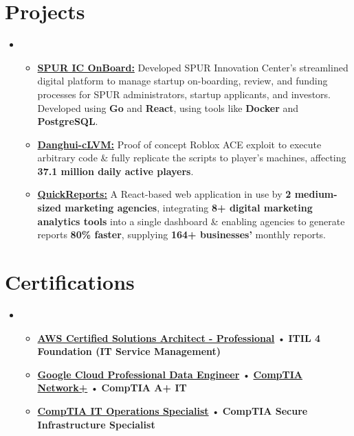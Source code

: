 \documentclass[letterpaper,11pt]{article}
\newcommand{\cvitem}[1]{
  \item\small{
    {#1\vspace{-2pt}}
  }
}
\newcommand{\cvheadingstart}{\begin{itemize}[leftmargin=0in, label={}]}
\newcommand{\cvheadingend}{\end{itemize}}
\newcommand{\cvitemstart}{\begin{itemize}\justifying}
\newcommand{\cvitemend}{\end{itemize}\vspace{-5pt}}
\begin{document}
\section{Projects}
\cvheadingstart
\item
\cvitemstart
  \cvitem{\textbf{\href{https://github.com/KonferCA/SPUR}{SPUR IC OnBoard:}} Developed SPUR Innovation Center's streamlined digital platform to manage startup on-boarding, review, and funding processes for SPUR administrators, startup applicants, and investors. Developed using \textbf{Go} and \textbf{React}, using tools like \textbf{Docker} and \textbf{PostgreSQL}.}
  \vspace{6pt}
  \cvitem{\textbf{\href{https://github.com/AmirAgassi/Danghui-LVM}{Danghui-cLVM:}} Proof of concept Roblox ACE exploit to execute arbitrary code \& fully replicate the scripts to player's machines, affecting \textbf{37.1 million daily active players}.}
  \vspace{6pt}
  \cvitem{\textbf{\href{https://quickreports.me}{QuickReports:}} A React-based web application in use by \textbf{2 medium-sized marketing agencies}, integrating \textbf{8+ digital marketing analytics tools} into a single dashboard \& enabling agencies to generate reports \textbf{80\% faster}, supplying \textbf{164+ businesses'} monthly reports.}
\cvitemend
\cvheadingend

\section{Certifications}
\cvheadingstart
\item
\cvitemstart
  \cvitem{
    \textbf{\href{https://cp.certmetrics.com/amazon/en/public/verify/credential/2LC36B3CWM411J3K}{AWS Certified Solutions Architect - Professional}} •
    \textbf{ITIL 4 Foundation (IT Service Management)}
  }
  \cvitem{
    \textbf{\href{https://www.credly.com/earner/earned/badge/c9811ec9-a04e-439f-a1bf-f4e18f11c6ee}{Google Cloud Professional Data Engineer}} •
    \textbf{\href{https://www.certmetrics.com/comptia/public/verification.aspx/}{CompTIA Network+}} •
    \textbf{CompTIA A+ IT}
  }
  \cvitem{
    \textbf{\href{https://www.certmetrics.com/comptia/public/verification.aspx/}{{CompTIA IT Operations Specialist}}} •
    \textbf{CompTIA Secure Infrastructure Specialist}
  }
\cvitemend
\cvheadingend
\end{document}
